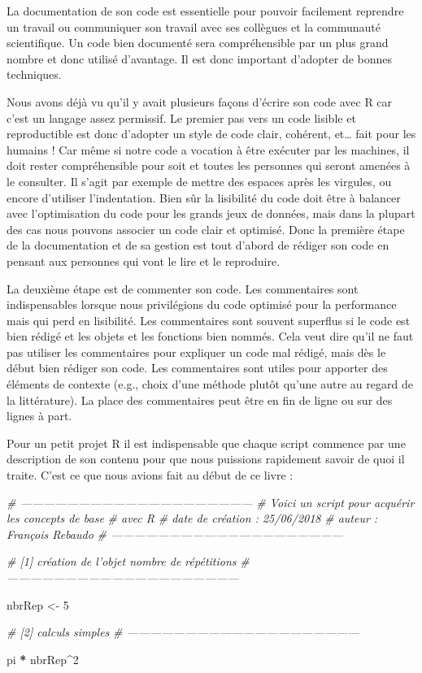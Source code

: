 \documentclass[]{book}
\newenvironment{Shaded}{\begin{snugshade}}{\end{snugshade}}
\newcommand{\CommentTok}[1]{\textcolor[rgb]{0.56,0.35,0.01}{\textit{#1}}}
\newcommand{\DecValTok}[1]{\textcolor[rgb]{0.00,0.00,0.81}{#1}}
\newcommand{\NormalTok}[1]{#1}
\newcommand{\OperatorTok}[1]{\textcolor[rgb]{0.81,0.36,0.00}{\textbf{#1}}}
\newcommand{\StringTok}[1]{\textcolor[rgb]{0.31,0.60,0.02}{#1}}
\begin{document}
La documentation de son code est essentielle pour pouvoir facilement reprendre un travail ou communiquer son travail avec ses collègues et la communauté scientifique. Un code bien documenté sera compréhensible par un plus grand nombre et donc utilisé d'avantage. Il est donc important d'adopter de bonnes techniques.

Nous avons déjà vu qu'il y avait plusieurs façons d'écrire son code avec R car c'est un langage assez permissif. Le premier pas vers un code lisible et reproductible est donc d'adopter un style de code clair, cohérent, et\ldots{} fait pour les humains ! Car même si notre code a vocation à être exécuter par les machines, il doit rester compréhensible pour soit et toutes les personnes qui seront amenées à le consulter. Il s'agit par exemple de mettre des espaces après les virgules, ou encore d'utiliser l'indentation. Bien sûr la lisibilité du code doit être à balancer avec l'optimisation du code pour les grands jeux de données, mais dans la plupart des cas nous pouvons associer un code clair et optimisé. Donc la première étape de la documentation et de sa gestion est tout d'abord de rédiger son code en pensant aux personnes qui vont le lire et le reproduire.

La deuxième étape est de commenter son code. Les commentaires sont indispensables lorsque nous privilégions du code optimisé pour la performance mais qui perd en lisibilité. Les commentaires sont souvent superflus si le code est bien rédigé et les objets et les fonctions bien nommés. Cela veut dire qu'il ne faut pas utiliser les commentaires pour expliquer un code mal rédigé, mais dès le début bien rédiger son code. Les commentaires sont utiles pour apporter des éléments de contexte (e.g., choix d'une méthode plutôt qu'une autre au regard de la littérature). La place des commentaires peut être en fin de ligne ou sur des lignes à part.

Pour un petit projet R il est indispensable que chaque script commence par une description de son contenu pour que nous puissions rapidement savoir de quoi il traite. C'est ce que nous avions fait au début de ce livre :

\begin{Shaded}
\begin{Highlighting}[]
\CommentTok{# ------------------------------------------------------------}
\CommentTok{# Voici un script pour acquérir les concepts de base }
\CommentTok{# avec R}
\CommentTok{# date de création : 25/06/2018}
\CommentTok{# auteur : François Rebaudo}
\CommentTok{# ------------------------------------------------------------}

\CommentTok{# [1] création de l'objet nombre de répétitions}
\CommentTok{# ------------------------------------------------------------}

\NormalTok{nbrRep <-}\StringTok{ }\DecValTok{5}

\CommentTok{# [2] calculs simples}
\CommentTok{# ------------------------------------------------------------}

\NormalTok{pi }\OperatorTok{*}\StringTok{ }\NormalTok{nbrRep}\OperatorTok{^}\DecValTok{2}
\end{Highlighting}
\end{Shaded}
\end{document}
